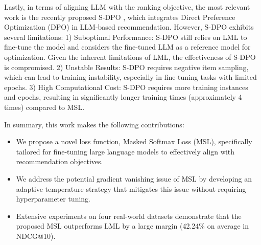 \documentclass[sigconf,natbib=true]{acmart}
\begin{document}
Lastly, in terms of aligning LLM with the ranking objective, the most relevant work is the recently proposed S-DPO \cite{chen2024softmax}, which integrates Direct Preference Optimization (DPO) \cite{rafailov2024direct} in LLM-based recommendation. However, S-DPO exhibits several limitations: 1) Suboptimal Performance: S-DPO still relies on LML to fine-tune the model and considers the fine-tuned LLM as a reference model for optimization. Given the inherent limitations of LML, the effectiveness of S-DPO is compromised. 2) Unstable Results: S-DPO requires negative item sampling, which can lead to training instability, especially in fine-tuning tasks with limited epochs. 3) High Computational Cost: S-DPO requires more training instances and epochs, resulting in significantly longer training times (approximately 4 times) compared to MSL. 






In summary, this work makes the following contributions:
\begin{itemize}[left=5pt]
\item We propose a novel loss function, Masked Softmax Loss (MSL), specifically tailored for fine-tuning large language models to effectively align with recommendation objectives.
\item We address the potential gradient vanishing issue of MSL by developing an adaptive temperature strategy that mitigates this issue without requiring hyperparameter tuning.
\item Extensive experiments on four real-world datasets demonstrate that the proposed MSL outperforms LML by a large margin (42.24\% on average in NDCG@10).
\end{itemize}
\end{document}
